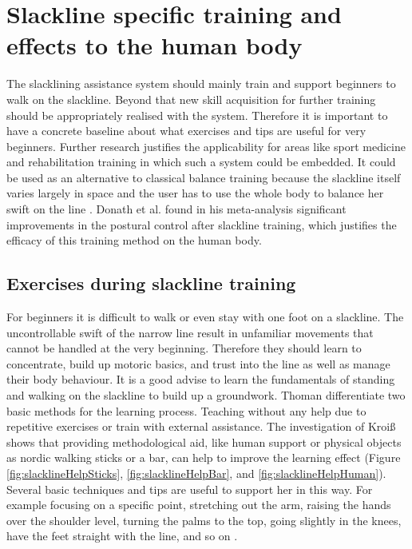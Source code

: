 \section{Slackline specific training and effects to the human body}

The slacklining assistance system should mainly train and support beginners to walk on the slackline. Beyond that new skill acquisition for further training should be appropriately realised with the system. Therefore it is important to have a concrete baseline about what exercises and tips are useful for very beginners.  Further research justifies the applicability for areas like sport medicine and rehabilitation training in which such a system could be embedded. It could be used as an alternative to classical balance training because the slackline itself varies largely in space and the user has to use the whole body to balance her swift on the line \cite{Pfusterschmied2013-yy}. Donath et al. \cite{Donath2016-rt} found in his meta-analysis significant improvements in the postural control after slackline training, which justifies the efficacy of this training method on the human body.

\subsection{Exercises during slackline training}

For beginners it is difficult to walk or even stay with one foot on a slackline. The uncontrollable swift of the narrow line result in unfamiliar movements that cannot be handled at the very beginning. Therefore they should learn to concentrate, build up motoric basics, and trust into the line as well as manage their body behaviour. It is a good advise to learn the fundamentals of standing and walking on the slackline to build up a groundwork.
Thoman \cite{Thomann2013-aa} differentiate two basic methods for the learning process. Teaching without any help due to repetitive exercises or train with external assistance. The investigation of Kroiß \cite{Kroiss2007-ab} shows that providing methodological aid, like human support or physical objects as nordic walking sticks or a bar, can help to improve the learning effect (Figure \ref{fig:slacklineHelpSticks}, \ref{fig:slacklineHelpBar}, and \ref{fig:slacklineHelpHuman}). Several basic techniques and tips are useful to support her in this way. For example focusing on a specific point, stretching out the arm, raising the hands over the shoulder level, turning the palms to the top, going slightly in the knees, have the feet straight with the line, and so on \cite{Kroiss2007-ab} \cite{Kleindl2011-bl}.


